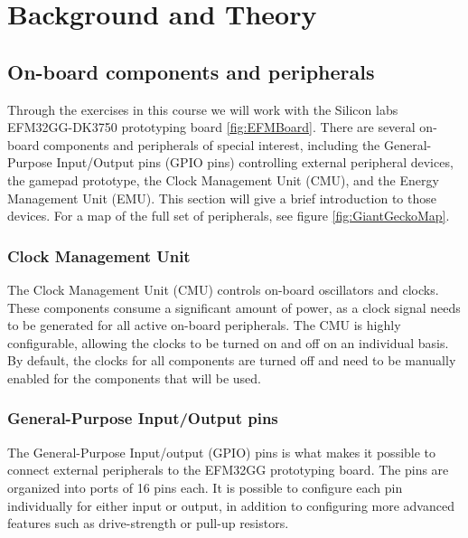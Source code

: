 \chapter{Background and Theory}


\section{On-board components and peripherals}
Through the exercises in this course we will work with the Silicon labs EFM32GG-DK3750 prototyping board \ref{fig:EFMBoard}. There are several on-board components and peripherals of special interest, including the General-Purpose Input/Output pins (GPIO pins) controlling external peripheral devices, the gamepad prototype, the Clock Management Unit (CMU), and the Energy Management Unit (EMU). This section will give a brief introduction to those devices. For a map of the full set of peripherals, see figure \ref{fig:GiantGeckoMap}.


\subsection{Clock Management Unit}
The Clock Management Unit (CMU) controls on-board oscillators and clocks. These components consume a significant amount of power, as a clock signal needs to be generated for all active on-board peripherals. The CMU is highly configurable, allowing the clocks to be turned on and off on an individual basis. By default, the clocks for all components are turned off and need to be manually enabled for the components that will be used.\cite{efm32gg-rm}


\subsection{General-Purpose Input/Output pins}
The General-Purpose Input/output (GPIO) pins is what makes it possible to connect external peripherals to the EFM32GG prototyping board. The pins are organized into ports of 16 pins each. It is possible to configure each pin individually for either input or output, in addition to configuring more advanced features such as drive-strength or pull-up resistors.


